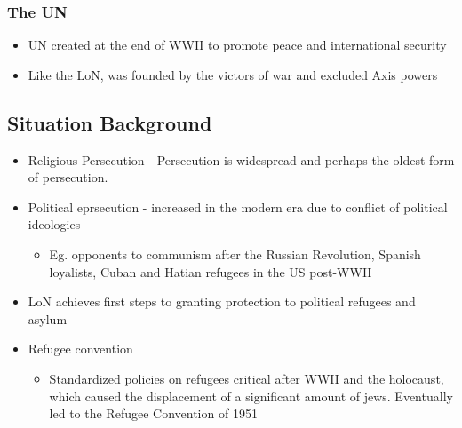 \documentclass[11pt]{article}
\begin{document}
\subsubsection{The UN}
\label{sec:orgddc2b35}
\begin{itemize}
\item UN created at the end of WWII to promote peace and international security
\item Like the LoN, was founded by the victors of war and excluded Axis powers
\end{itemize}
\subsection{Situation Background}
\label{sec:org825b2b9}
\begin{itemize}
\item Religious Persecution - Persecution is widespread and perhaps the oldest form of persecution.
\item Political eprsecution - increased in the modern era due to conflict of political ideologies
\begin{itemize}
\item Eg. opponents to communism after the Russian Revolution, Spanish loyalists, Cuban and Hatian refugees in the US post-WWII
\end{itemize}
\item LoN achieves first steps to granting protection to political refugees and asylum
\item Refugee convention
\begin{itemize}
\item Standardized policies on refugees critical after WWII and the holocaust, which caused the displacement of a significant amount of jews. Eventually led to the Refugee Convention of 1951
\end{itemize}
\end{itemize}
\end{document}
